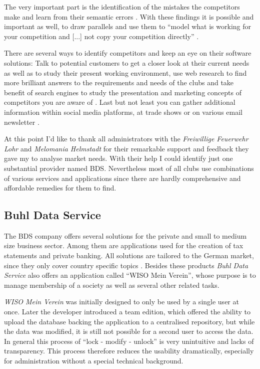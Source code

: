 The very important part is the identification of the mistakes the competitors make and learn from their semantic errors \cite{Hunter:2015aa}. With these findings it is possible and important as well, to draw parallels and use them to \enquote{model what is working for your competition and [...] not copy your competition directly} \cite{Hunter:2015aa}. 

There are several ways to identify competitors and keep an eye on their software solutions: Talk to potential customers to get a closer look at their current needs as well as to study their present working environment, use web research to find more brilliant answers to the requirements and needs of the clubs \cite{Philips:2015aa} and take benefit of search engines to study the presentation and marketing concepts of competitors you are aware of \cite{Philips:2015aa}. Last but not least you can gather additional information within social media platforms, at trade shows or on various email newsletter \cite{Dahl:2011aa}. 

At this point I'd like to thank all administrators with the \emph{Freiwillige Feuerwehr Lohr} and \emph{Melomania Helmstadt} for their remarkable support and feedback they gave my to analyse market needs. With their help I could identify just one substantial provider named \gls{BDS}. Nevertheless most of all clubs use combinations of various services and applications since there are hardly comprehensive and affordable remedies for them to find.

\subsection{Buhl Data Service}

The \gls{BDS} company offers several solutions for the private and small to medium size business sector. Among them are applications used for the creation of tax statements and private banking. All solutions are tailored to the German market, since they only cover country specific topics \cite{Buhl:2015aa}. Besides these products \emph{Buhl Data Service} also offers an application called \enquote{WISO Mein Verein}, whose purpose is to manage membership of a society as well as several other related tasks.

\emph{WISO Mein Verein} was initially designed to only be used by a single user at once. Later the developer introduced a team edition, which offered the ability to upload the database backing the application to a centralised repository, but while the data was modified, it is still not possible for a second user to access the data. In general this process of \enquote{lock - modify - unlock} is very unintuitive and lacks of transparency. This process therefore reduces the usability dramatically, especially for administration without a special technical background.

